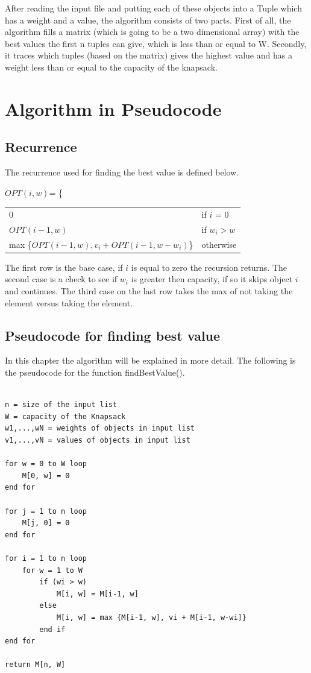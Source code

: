 \documentclass{inc/mas}
\begin{document}
After reading the input file and putting each of these objects into a Tuple which has a weight and a value, the algorithm consists of two parts. First of all, the algorithm fills a matrix (which is going to be a two dimensional array) with the best values the first n tuples can give, which is less than or equal to W. Secondly, it traces which tuples (based on the matrix) gives the highest value and has a weight less than or equal to the capacity of the knapsack. \\ 
 

\section{Algorithm in Pseudocode}

\subsection{Recurrence}
\label{Recurrance}

The recurrence used for finding the best value is defined below. \citep{Tardos} {\color{red}{Add referens to slides?}}

$OPT(i,w)$= \Bigg\{ \begin{tabular}{ll} 
0 & if $i$ = 0 \\
$OPT(i-1, w)$ & if $w_i > w$ \\
max \{$OPT(i-1, w), v_i + OPT(i-1, w-w_i )$\} & otherwise\\
\end{tabular}

The first row is the base case, if $i$ is equal to zero the recursion returns. The second case is a check to see if $w_i$ is greater then capacity, if so it skips object $i$ and continues. The third case on the last row takes the max of not taking the element versus taking the element. 

\subsection{Pseudocode for finding best value}
In this chapter the algorithm will be explained in more detail. The following is the pseudocode for the function findBestValue(). {\color{red}{Add referens to slides?}}\newline

\begin{lstlisting}

n = size of the input list
W = capacity of the Knapsack
w1,...,wN = weights of objects in input list
v1,...,vN = values of objects in input list

for w = 0 to W loop
	M[0, w] = 0
end for

for j = 1 to n loop
	M[j, 0] = 0
end for

for i = 1 to n loop
	for w = 1 to W
		if (wi > w)
			M[i, w] = M[i-1, w]
		else
			M[i, w] = max {M[i-1, w], vi + M[i-1, w-wi]}
		end if
end for

return M[n, W]

\end{lstlisting}
\end{document}
